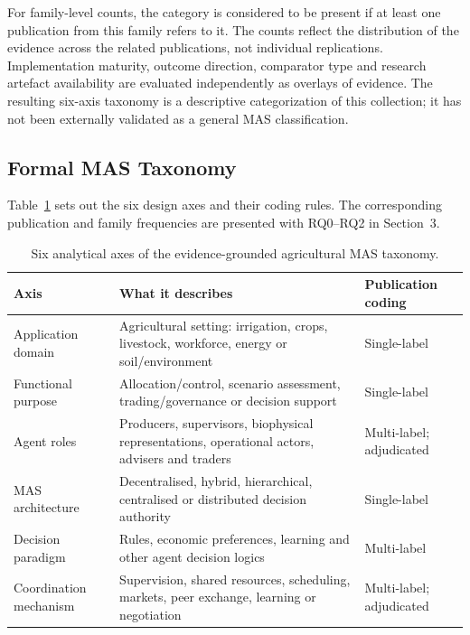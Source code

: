 \documentclass[11pt,a4paper]{article}
\begin{document}
For family-level counts, the category is considered to be present if at least one publication from this family refers to it. The counts reflect the distribution of the evidence across the related publications, not individual replications. Implementation maturity, outcome direction, comparator type and research artefact availability are evaluated independently as overlays of evidence. The resulting six-axis taxonomy is a descriptive categorization of this collection; it has not been externally validated as a general MAS classification.

\subsection{Formal MAS Taxonomy}

Table~\ref{tab:mas_taxonomy_axes} sets out the six design axes and
their coding rules. The corresponding publication and family
frequencies are presented with RQ0--RQ2 in Section~3.

\begin{table}[H]
\centering
\scriptsize
\caption{Six analytical axes of the evidence-grounded agricultural MAS taxonomy.}
\label{tab:mas_taxonomy_axes}
\begin{tabularx}{\textwidth}{@{}p{}Xp{}@{}}
\toprule
\textbf{Axis} & \textbf{What it describes} & \textbf{Publication coding} \\
\midrule
Application domain & Agricultural setting: irrigation, crops, livestock,
workforce, energy or soil/environment & Single-label \\
Functional purpose & Allocation/control, scenario assessment,
trading/governance or decision support & Single-label \\
Agent roles & Producers, supervisors, biophysical representations,
operational actors, advisers and traders & Multi-label; adjudicated \\
MAS architecture & Decentralised, hybrid, hierarchical, centralised
or distributed decision authority & Single-label \\
Decision paradigm & Rules, economic preferences, learning and
other agent decision logics & Multi-label \\
Coordination mechanism & Supervision, shared resources, scheduling,
markets, peer exchange, learning or negotiation & Multi-label; adjudicated \\
\bottomrule
\end{tabularx}
\end{table}
\end{document}
